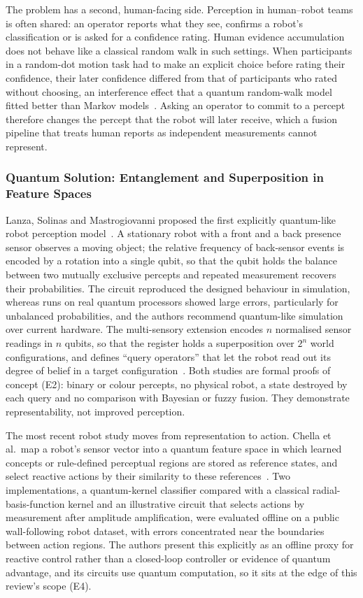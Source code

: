 \documentclass[pdflatex,sn-basic]{sn-jnl}
\begin{document}
The problem has a second, human-facing side. Perception in human--robot teams is often shared: an operator reports what they see, confirms a robot's classification or is asked for a confidence rating. Human evidence accumulation does not behave like a classical random walk in such settings. When participants in a random-dot motion task had to make an explicit choice before rating their confidence, their later confidence differed from that of participants who rated without choosing, an interference effect that a quantum random-walk model fitted better than Markov models~\citep{Kvam2015}. Asking an operator to commit to a percept therefore changes the percept that the robot will later receive, which a fusion pipeline that treats human reports as independent measurements cannot represent.

\subsubsection{Quantum Solution: Entanglement and Superposition in Feature Spaces}
Lanza, Solinas and Mastrogiovanni proposed the first explicitly quantum-like robot perception model~\citep{Lanza2020}. A stationary robot with a front and a back presence sensor observes a moving object; the relative frequency of back-sensor events is encoded by a rotation into a single qubit, so that the qubit holds the balance between two mutually exclusive percepts and repeated measurement recovers their probabilities. The circuit reproduced the designed behaviour in simulation, whereas runs on real quantum processors showed large errors, particularly for unbalanced probabilities, and the authors recommend quantum-like simulation over current hardware. The multi-sensory extension encodes $n$ normalised sensor readings in $n$ qubits, so that the register holds a superposition over $2^n$ world configurations, and defines ``query operators'' that let the robot read out its degree of belief in a target configuration~\citep{Lanza2021}. Both studies are formal proofs of concept (E2): binary or colour percepts, no physical robot, a state destroyed by each query and no comparison with Bayesian or fuzzy fusion. They demonstrate representability, not improved perception.

The most recent robot study moves from representation to action. Chella et al.\ map a robot's sensor vector into a quantum feature space in which learned concepts or rule-defined perceptual regions are stored as reference states, and select reactive actions by their similarity to these references~\citep{Chella2026}. Two implementations, a quantum-kernel classifier compared with a classical radial-basis-function kernel and an illustrative circuit that selects actions by measurement after amplitude amplification, were evaluated offline on a public wall-following robot dataset, with errors concentrated near the boundaries between action regions. The authors present this explicitly as an offline proxy for reactive control rather than a closed-loop controller or evidence of quantum advantage, and its circuits use quantum computation, so it sits at the edge of this review's scope (E4).
\end{document}
